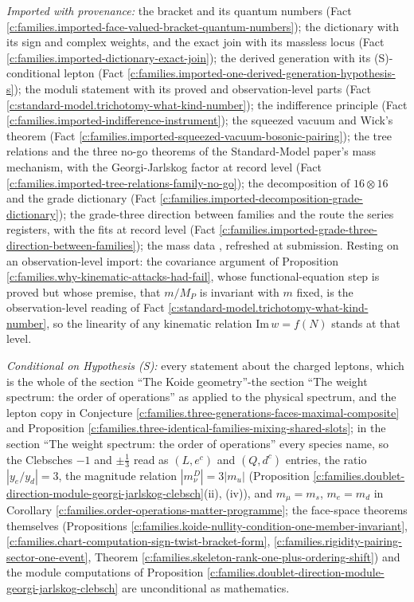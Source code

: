 \documentclass[11pt]{article}
\theoremstyle{definition}
\theoremstyle{plain}
\begin{document}
\emph{Imported with provenance:} the bracket and its quantum numbers (Fact \ref{c:families.imported-face-valued-bracket-quantum-numbers}); the dictionary with its sign and complex weights, and the exact join with its massless locus (Fact \ref{c:families.imported-dictionary-exact-join}); the derived generation with its (S)-conditional lepton (Fact \ref{c:families.imported-one-derived-generation-hypothesis-s}); the moduli statement with its proved and observation-level parts (Fact \ref{c:standard-model.trichotomy-what-kind-number}); the indifference principle (Fact \ref{c:families.imported-indifference-instrument}); the squeezed vacuum and Wick's theorem (Fact \ref{c:families.imported-squeezed-vacuum-bosonic-pairing}); the tree relations and the three no-go theorems of the Standard-Model paper's mass mechanism, with the Georgi-Jarlskog factor at record level (Fact \ref{c:families.imported-tree-relations-family-no-go}); the decomposition of $16 \otimes 16$ and the grade dictionary (Fact \ref{c:families.imported-decomposition-grade-dictionary}); the grade-three direction between families and the route the series registers, with the fits at record level (Fact \ref{c:families.imported-grade-three-direction-between-families}); the mass data \cite{PDG2024}, refreshed at submission. Resting on an observation-level import: the covariance argument of Proposition \ref{c:families.why-kinematic-attacks-had-fail}, whose functional-equation step is proved but whose premise, that $m/M_{P}$ is invariant with $m$ fixed, is the observation-level reading of Fact \ref{c:standard-model.trichotomy-what-kind-number}, so the linearity of any kinematic relation $\mathrm{Im}\,w = f(N)$ stands at that level.

\emph{Conditional on Hypothesis (S):} every statement about the charged leptons, which is the whole of the section ``The Koide geometry''-the section ``The weight spectrum: the order of operations'' as applied to the physical spectrum, and the lepton copy in Conjecture \ref{c:families.three-generations-faces-maximal-composite} and Proposition \ref{c:families.three-identical-families-mixing-shared-slots}; in the section ``The weight spectrum: the order of operations'' every species name, so the Clebsches $-1$ and $\pm\tfrac13$ read as $(L, e^{c})$ and $(Q, d^{c})$ entries, the ratio $|y_{e}/y_{d}| = 3$, the magnitude relation $|m_{\nu}^{D}| = 3|m_{u}|$ (Proposition \ref{c:families.doublet-direction-module-georgi-jarlskog-clebsch}(ii), (iv)), and $m_{\mu} = m_{s}$, $m_{e} = m_{d}$ in Corollary \ref{c:families.order-operations-matter-programme}; the face-space theorems themselves (Propositions \ref{c:families.koide-nullity-condition-one-member-invariant}, \ref{c:families.chart-computation-sign-twist-bracket-form}, \ref{c:families.rigidity-pairing-sector-one-event}, Theorem \ref{c:families.skeleton-rank-one-plus-ordering-shift}) and the module computations of Proposition \ref{c:families.doublet-direction-module-georgi-jarlskog-clebsch} are unconditional as mathematics.
\end{document}
